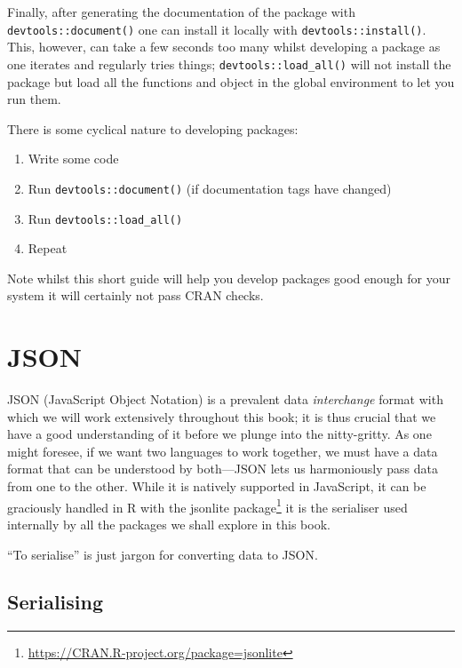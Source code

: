 \documentclass[
]{krantz}
\makeatletter
\providecommand{\tightlist}{%
  \setlength{\itemsep}{0pt}\setlength{\parskip}{0pt}}
\renewcommand{\href}[2]{#2\footnote{\url{#1}}}
\newenvironment{kframe}{%
\medskip{}
\setlength{\fboxsep}{.8em}
 \def\at@end@of@kframe{}%
 \ifinner\ifhmode%
  \def\at@end@of@kframe{\end{minipage}}%
  \begin{minipage}{\columnwidth}%
 \fi\fi%
 \def\FrameCommand##1{\hskip\@totalleftmargin \hskip-\fboxsep
 \colorbox{shadecolor}{##1}\hskip-\fboxsep
     \hskip-\linewidth \hskip-\@totalleftmargin \hskip\columnwidth}%
 \MakeFramed {\advance\hsize-\width
   \@totalleftmargin\z@ \linewidth\hsize
   \@setminipage}}%
 {\par\unskip\endMakeFramed%
 \at@end@of@kframe}
\newenvironment{rmdblock}[1]
  {
  \begin{itemize}
  \renewcommand{\labelitemi}{
    \raisebox{-.7\height}[0pt][0pt]{
      {\setkeys{Gin}{width=3em,keepaspectratio}\texttt{[image: images/\#1]}}
    }
  }
  \setlength{\fboxsep}{1em}
  \begin{kframe}
  \item
  }
  {
  \end{kframe}
  \end{itemize}
  }
\newenvironment{rmdnote}
  {\begin{rmdblock}{note}}
  {\end{rmdblock}}
\makeatother
\begin{document}
Finally, after generating the documentation of the package with \texttt{devtools::document()} one can install it locally with \texttt{devtools::install()}. This, however, can take a few seconds too many whilst developing a package as one iterates and regularly tries things; \texttt{devtools::load\_all()} will not install the package but load all the functions and object in the global environment to let you run them.

There is some cyclical nature to developing packages:

\begin{enumerate}
\def\labelenumi{\arabic{enumi}.}
\tightlist
\item
  Write some code
\item
  Run \texttt{devtools::document()} (if documentation tags have changed)
\item
  Run \texttt{devtools::load\_all()}
\item
  Repeat
\end{enumerate}

Note whilst this short guide will help you develop packages good enough for your system it will certainly not pass CRAN checks.

\hypertarget{basics-json}{%
\section{JSON}\label{basics-json}}

JSON (JavaScript Object Notation) is a prevalent data \emph{interchange} format with which we will work extensively throughout this book; it is thus crucial that we have a good understanding of it before we plunge into the nitty-gritty. As one might foresee, if we want two languages to work together, we must have a data format that can be understood by both---JSON lets us harmoniously pass data from one to the other. While it is natively supported in JavaScript, it can be graciously handled in R with the \href{https://CRAN.R-project.org/package=jsonlite}{jsonlite package} \citep{R-jsonlite} it is the serialiser used internally by all the packages we shall explore in this book.

\begin{rmdnote}
``To serialise'' is just jargon for converting data to JSON.
\end{rmdnote}

\hypertarget{serialising}{%
\subsection{Serialising}\label{serialising}}
\end{document}
